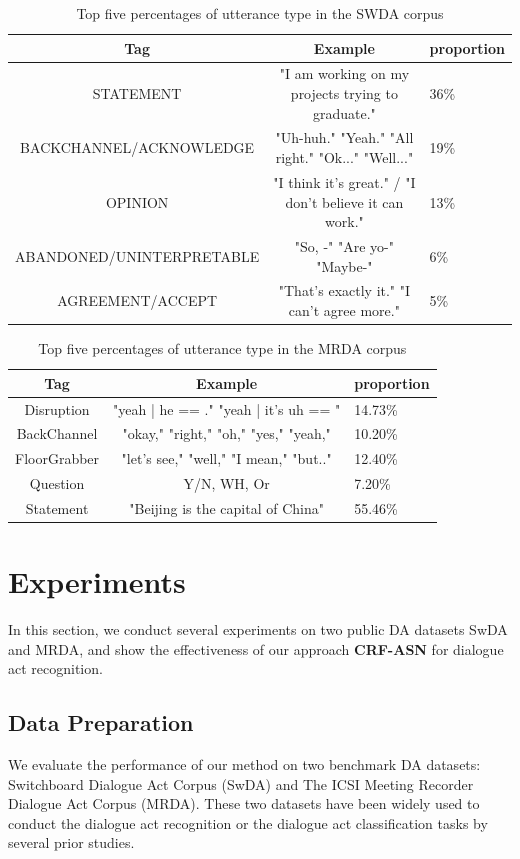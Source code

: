 \documentclass[sigconf]{acmart}
\begin{document}
\begin{table}
	\begin{tabular}{ccl}
		\toprule
		Tag    &Example &proportion       \\
		\midrule
		STATEMENT &"I am working on my projects trying to graduate." &36\% \\
		BACKCHANNEL/ACKNOWLEDGE &"Uh-huh."   "Yeah."  "All right." "Ok..."  "Well..." &19\% \\
		OPINION &"I think it's great." / "I don't believe it can work."&13\% \\
		ABANDONED/UNINTERPRETABLE &"So, -"  "Are yo-"  "Maybe-"&6\% \\
		AGREEMENT/ACCEPT &"That's exactly it." "I can't agree more."&5\% \\
		\bottomrule
	\end{tabular}
	\caption{Top five percentages of utterance type in the SWDA corpus}
\end{table}
\begin{table}
	\begin{tabular}{ccl}
		\toprule
		Tag    &Example &proportion \\
		\midrule
		Disruption &"yeah | he == ." "yeah | it's uh == " &14.73\% \\
		BackChannel & "okay," "right," "oh," "yes,"
		"yeah,"  &10.20\% \\
		FloorGrabber &"let's see,"
		"well," "I mean," "but.."   &12.40\% \\
		Question &Y/N, WH, Or &7.20\% \\
		Statement&"Beijing is the capital of China" &55.46\% \\
		\bottomrule
	\end{tabular}
	\caption{Top five percentages of utterance type in the MRDA corpus}
\end{table}

\section{Experiments}
In this section, we conduct several experiments on two public DA datasets SwDA and MRDA, and show the effectiveness of our approach \textbf{CRF-ASN} for dialogue act recognition.

\subsection{Data Preparation}
We evaluate the performance of our method on two benchmark DA datasets: Switchboard Dialogue Act Corpus (SwDA) and The ICSI Meeting Recorder Dialogue Act Corpus (MRDA). These two datasets have been widely used to conduct the dialogue act recognition or the dialogue act classification tasks by several prior studies. 
\end{document}
